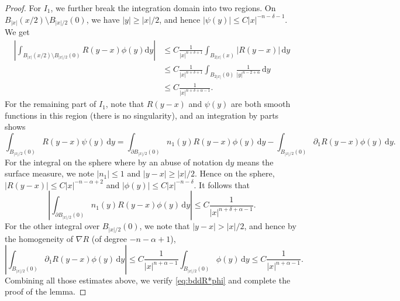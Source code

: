 \documentclass[10pt,a4paper]{amsart}
\newcommand{\dd}{\mathrm{d}}
\begin{document}
\begin{proof}
For $I_1$, we further break the integration domain into two regions. On $B_{|x|}(x/2)\setminus B_{|x|/2}(0)$, we have $|y|\ge |x|/2$, and hence $|\psi(y)|\le C|x|^{-n-\delta-1}$. We get
\begin{equation*}
\begin{aligned}
    \left| \int_{B_{|x|}(x/2)\setminus B_{|x|/2}(0)} R(y-x)\phi(y) \dd y\right| &\le C\frac{1}{|x|^{n+\delta+1}} \int_{B_{2|x|}(x)} |R(y-x)|\,\dd y\\
    &\le C\frac{1}{|x|^{n+\delta+1}} \int_{B_{2|x|}(0)} \frac{1}{|y|^{n-2+\alpha}}\,\dd y\\
    &\le C\frac{1}{|x|^{n+\delta+\alpha-1}}.
    \end{aligned}
\end{equation*}
For the remaining part of $I_1$, note that $R(y-x)$ and $\psi(y)$ are both smooth functions in this region (there is no singularity), and an integration by parts shows
\begin{equation*}
    \int_{B_{|x|/2}(0)} R(y-x)\psi(y)\,\dd y = \int_{\partial B_{|x|/2}(0)} n_1(y)R(y-x)\phi(y)\,\dd y - \int_{B_{|x|/2}(0)} \partial_1 R(y-x)\phi(y)\,\dd y.
\end{equation*}
For the integral on the sphere where by an abuse of notation $\dd y$ means the surface measure, we note $|n_1|\le 1$ and $|y-x|\ge |x|/2$. Hence on the sphere, $|R(y-x)|\le C|x|^{-n-\alpha+2}$ and $|\phi(y)|\le C|x|^{-n-\delta}$. It follows that
\begin{equation*}
    \left|\int_{\partial B_{|x|/2}(0)} n_1(y)R(y-x)\phi(y)\,\dd y\right| \le C\frac{1}{|x|^{n+\delta+\alpha-1}}.
\end{equation*}
For the other integral over $B_{|x|/2}(0)$, we note that $|y-x|>|x|/2$, and hence by the homogeneity of $\nabla R$ (of degree $-n-\alpha+1$), 
\begin{equation*}
    \left|\int_{B_{|x|/2}(0)} \partial_1 R(y-x)\phi(y)\,\dd y\right| \le C\frac{1}{|x|^{n+\alpha-1}} \int_{B_{|x|/2}(0)} \phi(y)\,\dd y \le C\frac{1}{|x|^{n+\alpha-1}}.
\end{equation*}
Combining all those estimates above, we verify \eqref{eq:bddR*phi} and complete the proof of the lemma.
\end{proof}
\end{document}
